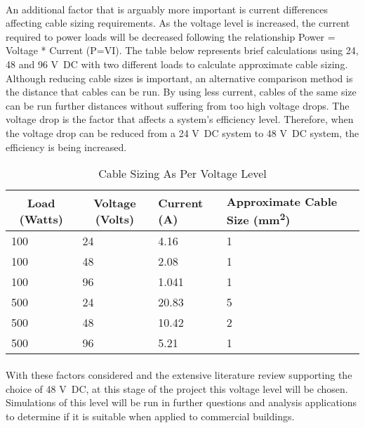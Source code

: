 \paragraph{}
An additional factor that is arguably more important is current differences affecting cable sizing requirements. As the voltage level is increased, the current required to power loads will be decreased following the relationship Power = Voltage * Current (P=VI). The table below represents brief calculations using 24, 48 and 96 \si{V DC} with two different loads to calculate approximate cable sizing. Although reducing cable sizes is important, an alternative comparison method is the distance that cables can be run. By using less current, cables of the same size can be run further distances without suffering from too high voltage drops. The voltage drop is the factor that affects a system's efficiency level. Therefore, when the voltage drop can be reduced from a 24 \si{V DC} system to 48 \si{V DC} system, the efficiency is being increased. 

\begin{table}[H]
\centering
\begin{tabular}{|l|l|l|l|}
\hline
\multicolumn{1}{|c|}{\textbf{Load (Watts)}} & \multicolumn{1}{c|}{\textbf{Voltage (Volts)}} & \textbf{Current (A)} & \textbf{Approximate Cable Size (\si{mm^2})} \\ \hline
100 & 24 & 4.16 & 1 \\ \hline
100 & 48 & 2.08 & 1 \\ \hline
100 & 96 & 1.041 & 1 \\ \hline
500 & 24 & 20.83 & 5 \\ \hline
500 & 48 & 10.42 & 2 \\ \hline
500 & 96 & 5.21 & 1 \\ \hline
\end{tabular}
\caption{Cable Sizing As Per Voltage Level}
\label{lvdc-cables}
\end{table} 

\paragraph{}
With these factors considered and the extensive literature review supporting the choice of 48 \si{V DC}, at this stage of the project this voltage level will be chosen. Simulations of this level will be run in further questions and analysis applications to determine if it is suitable when applied to commercial buildings.  

   

